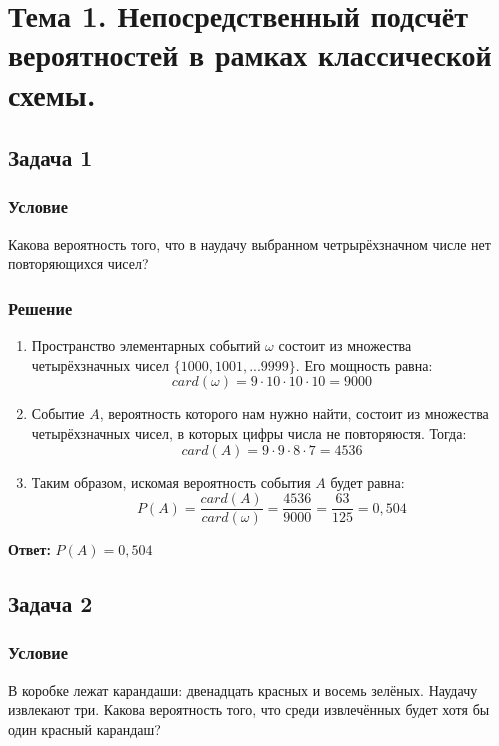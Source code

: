 \documentclass[14pt]{article}
\begin{document}
    \section*{Тема 1.
    Непосредственный подсчёт вероятностей в рамках классической схемы.}

    \subsection*{Задача 1}
    \subsubsection*{Условие}

    Какова вероятность того, что в наудачу выбранном четрырёхзначном числе нет повторяющихся чисел?

    \subsubsection*{Решение}

    \begin{enumerate}[wide, labelwidth=!, labelindent=0pt]
        \item Пространство элементарных событий $\omega$ состоит из множества четырёхзначных чисел $\{1000, 1001, ... 9999\}$.
            Его мощность равна:
            \[card (\omega)= 9 \cdot 10 \cdot 10 \cdot 10 = 9000 \]
        \item Событие $A$, вероятность которого нам нужно найти, состоит из множества четырёхзначных чисел, в которых цифры числа не повторяюстя.
            Тогда:
            \[card (A) = 9 \cdot 9 \cdot 8 \cdot 7 = 4536\]
        \item Таким образом, искомая вероятность события $A$ будет равна:
            \[P(A) = \frac{card(A)}{card(\omega)} = \frac{4536}{9000} = \frac{63}{125} = 0,504\]
    \end{enumerate}

    \hspace{290pt}\textbf{Ответ:} $P(A) = 0,504$

    \subsection*{Задача 2}
    \subsubsection*{Условие}

    В коробке лежат карандаши: двенадцать красных и восемь зелёных. Наудачу извлекают три.
    Какова вероятность того, что среди извлечённых будет хотя бы один красный карандаш?
\end{document}

